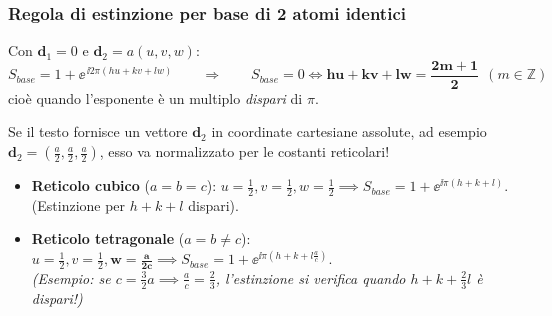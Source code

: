 \subsubsection*{Regola di estinzione per base di 2 atomi identici}
Con $\mathbf{d}_1=0$ e $\mathbf{d}_2 = a(u,v,w)$:
\[ S_{base}= 1 + \ee^{\,\ii 2\pi (hu+kv+lw)} \qquad\Longrightarrow\qquad
   S_{base}=0 \iff \bm{hu+kv+lw = \frac{2m+1}{2}} \ \ (m\in\mathbb{Z}) \]
cioè quando l'esponente è un multiplo \emph{dispari} di $\pi$.

Se il testo fornisce un vettore $\mathbf{d}_2$ in coordinate cartesiane assolute, ad esempio $\mathbf{d}_2 = (\frac{a}{2}, \frac{a}{2}, \frac{a}{2})$, esso va normalizzato per le costanti reticolari!
\begin{itemize}
    \setlength{\itemsep}{1pt}
    \item \textbf{Reticolo cubico} ($a=b=c$): $u=\frac{1}{2}, v=\frac{1}{2}, w=\frac{1}{2} \implies S_{base} = 1 + \ee^{\ii\pi(h+k+l)}$. (Estinzione per $h+k+l$ dispari).
    \item \textbf{Reticolo tetragonale} ($a=b\neq c$): $u=\frac{1}{2}, v=\frac{1}{2}, \bm{w=\frac{a}{2c}} \implies S_{base} = 1 + \ee^{\ii\pi\left(h+k+l\frac{a}{c}\right)}$.\\
    \textit{(Esempio: se $c = \frac{3}{2}a \implies \frac{a}{c} = \frac{2}{3}$, l'estinzione si verifica quando $h+k+\frac{2}{3}l$ è dispari!)}
\end{itemize}

